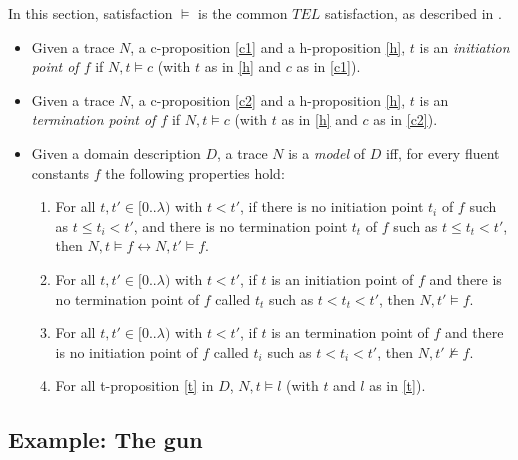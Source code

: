 In this section, satisfaction $\vDash$ is the common $TEL$ satisfaction, as described in \cite{cakascsc18a}.

\begin{itemize}
  \item Given a trace $N$, a c-proposition \ref{c1} and a h-proposition \ref{h}, $t$ is an \emph{initiation point of $f$} if $N,t \vDash c$ (with $t$ as in \ref{h} and $c$ as in \ref{c1}).
  \item Given a trace $N$, a c-proposition \ref{c2} and a h-proposition \ref{h}, $t$ is an \emph{termination point of $f$} if $N,t \vDash c$ (with $t$ as in \ref{h} and $c$ as in \ref{c2}).
  \item Given a domain description $D$, a trace $N$ is a \emph{model} of $D$ iff, for every fluent constants $f$ the following properties hold:
  \begin{enumerate}
    \item For all $t,t'\in [0..\lambda)$ with $t<t'$, if there is no initiation point $t_i$ of $f$ such as $t \leq t_i < t'$, and there is no termination point $t_t$ of $f$ such as $t \leq t_t < t'$, then $N,t \vDash f \leftrightarrow N,t' \vDash f$.
    \item For all $t,t'\in [0..\lambda)$ with $t<t'$, if $t$ is an initiation point of $f$ and there is no termination point of $f$ called $t_t$ such as $t < t_t < t'$, then $N,t' \vDash f$.
    \item For all $t,t'\in [0..\lambda)$ with $t<t'$, if $t$ is an termination point of $f$ and there is no initiation point of $f$ called $t_i$ such as $t < t_i < t'$, then $N,t' \nvDash f$.
    \item For all t-proposition \ref{t} in $D$, $N,t \vDash l$ (with $t$ and $l$ as in \ref{t}).
  \end{enumerate}
\end{itemize}

\subsection{Example: The gun}

